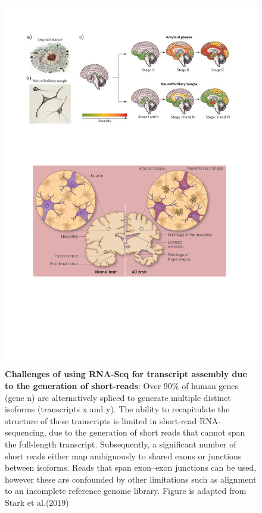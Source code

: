 \begin{landscape}
	\begin{figure}[htp]
		\centering
		\includegraphics[page=10,trim={0 19cm 2cm 1cm},clip, scale = 1]{Figures/Introduction_Figures.pdf}
		\captionsetup{width=1.2\textwidth}
		\caption[Challenges of using short-reads for transcript assembly]%
		{\textbf{Challenges of using RNA-Seq for transcript assembly due to the generation of short-reads}: Over 90\% of human genes (gene n) are alternatively spliced to generate multiple distinct isoforms (transcripts x and y). The ability to recapitulate the structure of these transcripts is limited in short-read RNA-sequencing, due to the generation of short reads that cannot span the full-length transcript. Subsequently, a significant number of short reads either map ambiguously to shared exons or junctions between isoforms. Reads that span exon–exon junctions can be used, however these are confounded by other limitations such as alignment to an incomplete reference genome library. Figure is adapted from Stark et al.(2019) \cite{Stark2019}}
		\label{fig:rna_seq_limitations}
	\end{figure}
\end{landscape}


